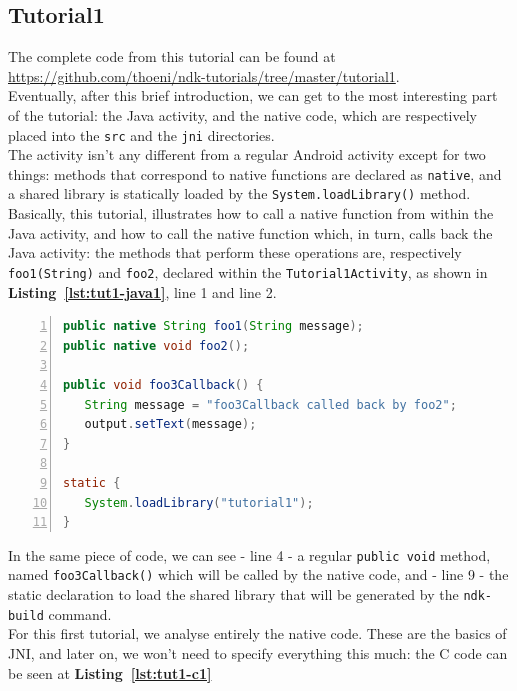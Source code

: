 \documentclass[a4paper,10pt]{article}
\newcommand{\keyword}[1]{\texttt{#1}}
\newcommand{\refl}[1]{\textbf{Listing~\ref{#1}}}
\begin{document}
\begin{multicols}{2}
\section{Tutorial1}
\label{sec:tutorial1}
The complete code from this tutorial can be found at \url{https://github.com/thoeni/ndk-tutorials/tree/master/tutorial1}.\\
Eventually, after this brief introduction, we can get to the most interesting part of the tutorial: the Java activity, and the native code, which are respectively placed into the \keyword{src} and the \keyword{jni} directories.\\
The activity isn't any different from a regular Android activity except for two things: methods that correspond to native functions are declared as \keyword{native}, and a shared library is statically loaded by the \keyword{System.loadLibrary()} method.\\
Basically, this tutorial, illustrates how to call a native function from within the Java activity, and how to call the native function which, in turn, calls back the Java activity: the methods that perform these operations are, respectively \keyword{foo1(String)} and \keyword{foo2}, declared within the \keyword{Tutorial1Activity}, as shown in \refl{lst:tut1-java1}, line 1 and line 2.

\begin{lstlisting}[language=Java,
				   columns=fullflexible,
				   showstringspaces=false,
				   xleftmargin=15pt,
				   frame = l,
				   numbers=left,
				   commentstyle=\color{gray}\upshape,
				   caption=Part of Tutorial1Activity.java,
				   label=lst:tut1-java1]
public native String foo1(String message);
public native void foo2();
  
public void foo3Callback() {
   String message = "foo3Callback called back by foo2";
   output.setText(message);
}
  
static {
   System.loadLibrary("tutorial1");
}
\end{lstlisting}
In the same piece of code, we can see - line 4 - a regular \keyword{public void} method, named \keyword{foo3Callback()} which will be called by the native code, and - line 9 - the static declaration to load the shared library that will be generated by the \keyword{ndk-build} command.\\
For this first tutorial, we analyse entirely the native code. These are the basics of JNI, and later on, we won't need to specify everything this much: the C code can be seen at \refl{lst:tut1-c1}


\end{multicols}
\end{document}

